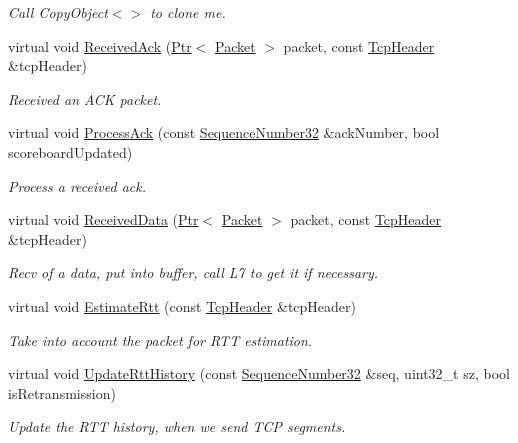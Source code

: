 \begin{DoxyCompactItemize}
\begin{DoxyCompactList}\small\item\em Call Copy\+Object$<$$>$ to clone me. \end{DoxyCompactList}\item 
virtual void \hyperlink{classns3_1_1TcpSocketBase_a695c036628adf8a204a653dbf178f8cd}{Received\+Ack} (\hyperlink{classns3_1_1Ptr}{Ptr}$<$ \hyperlink{classns3_1_1Packet}{Packet} $>$ packet, const \hyperlink{classns3_1_1TcpHeader}{Tcp\+Header} \&tcp\+Header)
\begin{DoxyCompactList}\small\item\em Received an A\+CK packet. \end{DoxyCompactList}\item 
virtual void \hyperlink{classns3_1_1TcpSocketBase_a7c8a0eb71e14abececff528e8d4261b6}{Process\+Ack} (const \hyperlink{group__network_gacb2070e4e98d2d5135c9bede58f07a03}{Sequence\+Number32} \&ack\+Number, bool scoreboard\+Updated)
\begin{DoxyCompactList}\small\item\em Process a received ack. \end{DoxyCompactList}\item 
virtual void \hyperlink{classns3_1_1TcpSocketBase_a479e1a8be1ee1b169f87e57a4dc6f73c}{Received\+Data} (\hyperlink{classns3_1_1Ptr}{Ptr}$<$ \hyperlink{classns3_1_1Packet}{Packet} $>$ packet, const \hyperlink{classns3_1_1TcpHeader}{Tcp\+Header} \&tcp\+Header)
\begin{DoxyCompactList}\small\item\em Recv of a data, put into buffer, call L7 to get it if necessary. \end{DoxyCompactList}\item 
virtual void \hyperlink{classns3_1_1TcpSocketBase_af10157be4b91fdefbc3f618baf6919b2}{Estimate\+Rtt} (const \hyperlink{classns3_1_1TcpHeader}{Tcp\+Header} \&tcp\+Header)
\begin{DoxyCompactList}\small\item\em Take into account the packet for R\+TT estimation. \end{DoxyCompactList}\item 
virtual void \hyperlink{classns3_1_1TcpSocketBase_af66bb88aa9438d6abbc9f8b941ab5cc8}{Update\+Rtt\+History} (const \hyperlink{group__network_gacb2070e4e98d2d5135c9bede58f07a03}{Sequence\+Number32} \&seq, uint32\+\_\+t sz, bool is\+Retransmission)
\begin{DoxyCompactList}\small\item\em Update the R\+TT history, when we send T\+CP segments. \end{DoxyCompactList}\item 

\end{DoxyCompactItemize}

